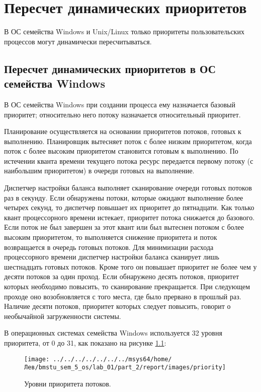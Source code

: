 \chapter{Пересчет динамических приоритетов}
В ОС семейства Windows и Unix/Linux только приоритеты пользовательских процессов могут динамически пересчитываться.

\section{Пересчет динамических приоритетов в ОС семейства Windows}
В ОС семейства Windows при создании процесса ему назначается базовый приоритет; относительно него потоку назначается относительный приоритет.

Планирование осуществляется на основании приоритетов потоков, готовых к выполнению. Планировщик вытесняет поток с более низким приоритетом, когда поток с более высоким приоритетом становится готовым к выполнению. По истечении кванта времени текущего потока ресурс передается первому потоку (с наибольшим приоритетом) в очереди готовых на выполнение.

Диспетчер настройки баланса выполняет сканирование очереди готовых потоков раз в секунду. Если обнаружены потоки, которые ожидают выполнение более четырех секунд, то диспетчер повышает их приоритет до пятнадцати. Как только квант процессорного времени истекает, приоритет потока снижается до базового. Если поток не был завершен за этот квант или был вытеснен потоком с более высоким приоритетом, то выполняется снижение приоритета и поток возвращается в очередь готовых потоков. Для минимизации расхода процессорного времени диспетчер настройки баланса сканирует лишь шестнадцать готовых потоков. Кроме того он повышает приоритет не более чем у десяти потоков за один проход. Если обнаружено десять потоков, приоритет которых необходимо повысить, то сканирование прекращается. При следующем проходе оно возобновляется с того места, где было прервано в прошлый раз. Наличие десяти потоков, приоритет которых следует повысить, говорит о необычайной загруженности системы.

В операционных системах семейства Windows используется 32 уровня приоритета, от 0 до 31, как показано на рисунке \ref{png:priority}:

\begin{figure}[H]
	\centering
	{
		\texttt{[image: ../../../../../../../msys64/home/Лев/bmstu\_sem\_5\_os/lab\_01/part\_2/report/images/priority]}
		\caption{Уровни приоритета потоков.}
		\label{png:priority}
	}
\end{figure}

